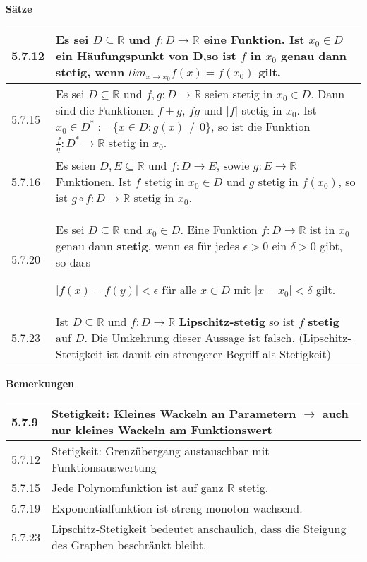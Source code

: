     \noindent 
    \textbf{Sätze}
    \begin{table}[H]
    \begin{tabularx}{\textwidth}{X m{16cm}}
        \toprule

        5.7.12& Es sei $D \subseteq \mathbb{R}$ und $f : D \rightarrow \mathbb{R}$ eine Funktion. Ist $x_0 \in D$ ein Häufungspunkt
                von D,so ist $f$ in $x_0$ genau dann \textbf{stetig}, wenn $lim_{x \rightarrow x_0} f(x) = f(x_0)$ gilt. \\
        \midrule
        5.7.15& Es sei $D \subseteq \mathbb{R}$ und $f,g : D \rightarrow \mathbb{R}$ seien stetig in $x_0 \in D$. Dann sind die
                Funktionen $f+g$, $fg$ und $|f|$ stetig in $x_0$. \hfill \break
                Ist $x_0 \in D^* := \{ x \in D: g(x) \neq 0\}$, so ist die Funktion $\frac{f}{q}:D^* \rightarrow \mathbb{R}$ stetig in $x_0$.\\
        \midrule
        5.7.16& Es seien $D,E \subseteq \mathbb{R}$ und $f: D \rightarrow E$, sowie $g: E \rightarrow \mathbb{R}$ Funktionen. Ist $f$ 
                stetig in $x_0 \in D$ und $g$ stetig in $f(x_0)$, so ist $g \circ f: D \rightarrow \mathbb{R}$ stetig in $x_0$. \\ 
        \midrule
        5.7.20& Es sei $D \subseteq \mathbb{R}$ und $x_0 \in D$. Eine Funktion $f: D \rightarrow \mathbb{R}$ ist in $x_0$ genau dann
                \textbf{stetig}, wenn es für jedes $\epsilon > 0$ ein $\delta > 0$ gibt, so dass \hfill \break
                \centerline{$|f(x) - f(y)| < \epsilon$ für alle $x \in D$ mit $|x-x_0|<\delta$ gilt.} \\
        \midrule
        5.7.23& Ist $D \subseteq \mathbb{R}$ und $f:D \rightarrow \mathbb{R}$ \textbf{Lipschitz-stetig} so ist $f$ \textbf{stetig} auf $D$.
                Die Umkehrung dieser Aussage ist falsch. (Lipschitz-Stetigkeit ist damit ein strengerer Begriff als Stetigkeit) \\
        \bottomrule
    \end{tabularx}
    \end{table}

    \noindent
    \textbf{Bemerkungen}
    \begin{table}[H]
    \begin{tabularx}{\textwidth}{X m{16cm}}
        \toprule

        5.7.9 & Stetigkeit: Kleines Wackeln an Parametern $\rightarrow$ auch nur kleines Wackeln am Funktionswert \\
        \midrule
        5.7.12& Stetigkeit: Grenzübergang austauschbar mit Funktionsauswertung \\
        \midrule
        5.7.15& Jede Polynomfunktion ist auf ganz $\mathbb{R}$ stetig. \\
        \midrule
        5.7.19& Exponentialfunktion ist streng monoton wachsend. \\
        \midrule
        5.7.23& Lipschitz-Stetigkeit bedeutet anschaulich, dass die Steigung des Graphen beschränkt bleibt. \\

        \bottomrule
    \end{tabularx}
    \end{table}

